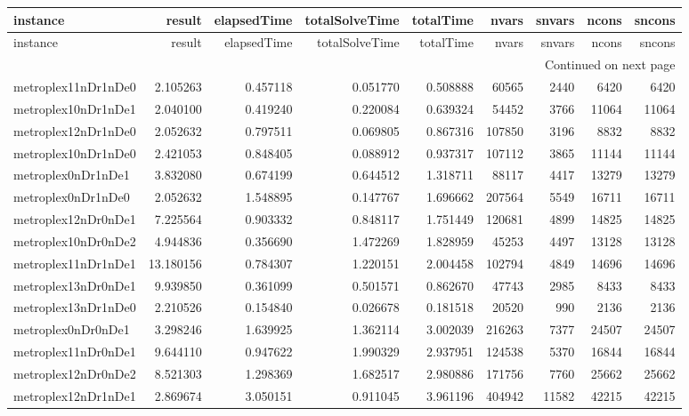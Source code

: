 
\begin{longtable}{|l|r|r|r|r|r|r|r|r|}
\toprule
instance & result & elapsedTime & totalSolveTime & totalTime & nvars & snvars & ncons & sncons \\
\midrule
\endfirsthead
\toprule
instance & result & elapsedTime & totalSolveTime & totalTime & nvars & snvars & ncons & sncons \\
\midrule
\endhead
\midrule
\multicolumn{9}{r}{Continued on next page} \\
\midrule
\endfoot
\bottomrule
\endlastfoot
metroplex11nDr1nDe0 & 2.105263 & 0.457118 & 0.051770 & 0.508888 & 60565 & 2440 & 6420 & 6420 \\
metroplex10nDr1nDe1 & 2.040100 & 0.419240 & 0.220084 & 0.639324 & 54452 & 3766 & 11064 & 11064 \\
metroplex12nDr1nDe0 & 2.052632 & 0.797511 & 0.069805 & 0.867316 & 107850 & 3196 & 8832 & 8832 \\
metroplex10nDr1nDe0 & 2.421053 & 0.848405 & 0.088912 & 0.937317 & 107112 & 3865 & 11144 & 11144 \\
metroplex0nDr1nDe1 & 3.832080 & 0.674199 & 0.644512 & 1.318711 & 88117 & 4417 & 13279 & 13279 \\
metroplex0nDr1nDe0 & 2.052632 & 1.548895 & 0.147767 & 1.696662 & 207564 & 5549 & 16711 & 16711 \\
metroplex12nDr0nDe1 & 7.225564 & 0.903332 & 0.848117 & 1.751449 & 120681 & 4899 & 14825 & 14825 \\
metroplex10nDr0nDe2 & 4.944836 & 0.356690 & 1.472269 & 1.828959 & 45253 & 4497 & 13128 & 13128 \\
metroplex11nDr1nDe1 & 13.180156 & 0.784307 & 1.220151 & 2.004458 & 102794 & 4849 & 14696 & 14696 \\
metroplex13nDr0nDe1 & 9.939850 & 0.361099 & 0.501571 & 0.862670 & 47743 & 2985 & 8433 & 8433 \\
metroplex13nDr1nDe0 & 2.210526 & 0.154840 & 0.026678 & 0.181518 & 20520 & 990 & 2136 & 2136 \\
metroplex0nDr0nDe1 & 3.298246 & 1.639925 & 1.362114 & 3.002039 & 216263 & 7377 & 24507 & 24507 \\
metroplex11nDr0nDe1 & 9.644110 & 0.947622 & 1.990329 & 2.937951 & 124538 & 5370 & 16844 & 16844 \\
metroplex12nDr0nDe2 & 8.521303 & 1.298369 & 1.682517 & 2.980886 & 171756 & 7760 & 25662 & 25662 \\
metroplex12nDr1nDe1 & 2.869674 & 3.050151 & 0.911045 & 3.961196 & 404942 & 11582 & 42215 & 42215 \\

\end{longtable}
